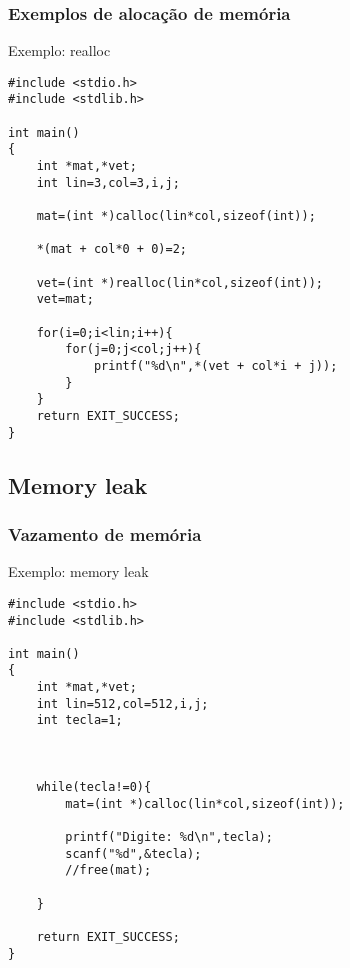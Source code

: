 \begin{frame}[fragile]
  \frametitle{Exemplos de alocação de memória}
  

  \begin{block}{Exemplo: realloc}
  \begin{lstlisting}
#include <stdio.h>
#include <stdlib.h>

int main()
{
    int *mat,*vet;
    int lin=3,col=3,i,j;

    mat=(int *)calloc(lin*col,sizeof(int));

    *(mat + col*0 + 0)=2;

    vet=(int *)realloc(lin*col,sizeof(int));
    vet=mat;

    for(i=0;i<lin;i++){
        for(j=0;j<col;j++){
            printf("%d\n",*(vet + col*i + j));
        }
    }
    return EXIT_SUCCESS;
}

  \end{lstlisting}
  \end{block}
\end{frame}

\subsection{Memory leak}

\begin{frame}[fragile]
  \frametitle{Vazamento de memória}
  

  \begin{block}{Exemplo: memory leak}
  \begin{lstlisting}
#include <stdio.h>
#include <stdlib.h>

int main()
{
    int *mat,*vet;
    int lin=512,col=512,i,j;
    int tecla=1;



    while(tecla!=0){
        mat=(int *)calloc(lin*col,sizeof(int));

        printf("Digite: %d\n",tecla);
        scanf("%d",&tecla);
        //free(mat);

    }

    return EXIT_SUCCESS;
}


  \end{lstlisting}
  \end{block}
\end{frame}